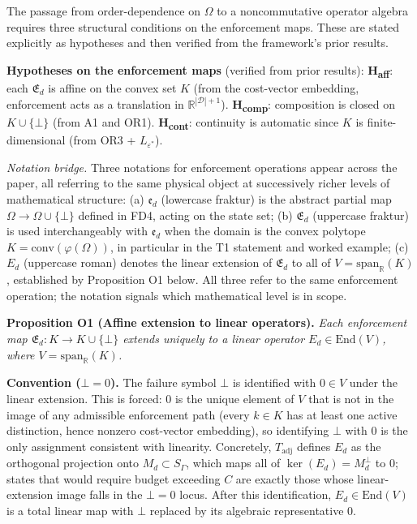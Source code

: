 \documentclass[11pt]{article}
\theoremstyle{remark}
\begin{document}
The passage from order-dependence on $\Omega$ to a noncommutative operator algebra requires three structural conditions on the enforcement maps.  These are stated explicitly as hypotheses and then verified from the framework's prior results.

\smallskip\noindent\textbf{Hypotheses on the enforcement maps} (verified from prior results):
\textbf{H\textsubscript{aff}}: each $\mathfrak{E}_d$ is affine on the convex set $K$ (from the cost-vector embedding, enforcement acts as a translation in $\mathbb{R}^{|\mathcal{D}|+1}$).
\textbf{H\textsubscript{comp}}: composition is closed on $K \cup \{\bot\}$ (from A1 and OR1).
\textbf{H\textsubscript{cont}}: continuity is automatic since $K$ is finite-dimensional (from OR3 + $L_{\varepsilon^*}$).

\smallskip\noindent\textit{Notation bridge.}  Three notations for enforcement operations appear across the paper, all referring to the same physical object at successively richer levels of mathematical structure: (a) $\mathfrak{e}_d$ (lowercase fraktur) is the abstract partial map $\Omega \to \Omega \cup \{\bot\}$ defined in FD4, acting on the state set; (b) $\mathfrak{E}_d$ (uppercase fraktur) is used interchangeably with $\mathfrak{e}_d$ when the domain is the convex polytope $K = \mathrm{conv}(\varphi(\Omega))$, in particular in the T1 statement and worked example; (c) $E_d$ (uppercase roman) denotes the linear extension of $\mathfrak{E}_d$ to all of $V = \mathrm{span}_\mathbb{R}(K)$, established by Proposition O1 below.  All three refer to the same enforcement operation; the notation signals which mathematical level is in scope.

\smallskip\noindent\textbf{Proposition O1 (Affine extension to linear operators).}
\emph{Each enforcement map $\mathfrak{E}_d: K \to K \cup \{\bot\}$ extends uniquely to a linear operator $E_d \in \mathrm{End}(V)$, where $V = \mathrm{span}_\mathbb{R}(K)$.}

\smallskip\noindent\textbf{Convention ($\bot = 0$).}  The failure symbol $\bot$ is identified with $0 \in V$ under the linear extension.  This is forced: $0$ is the unique element of $V$ that is not in the image of any admissible enforcement path (every $k \in K$ has at least one active distinction, hence nonzero cost-vector embedding), so identifying $\bot$ with $0$ is the only assignment consistent with linearity.  Concretely, $T_{\mathrm{adj}}$ defines $E_d$ as the orthogonal projection onto $M_d \subset S_\Gamma$, which maps all of $\ker(E_d) = M_d^\perp$ to $0$; states that would require budget exceeding $C$ are exactly those whose linear-extension image falls in the $\bot = 0$ locus.  After this identification, $E_d \in \mathrm{End}(V)$ is a total linear map with $\bot$ replaced by its algebraic representative $0$.
\end{document}

